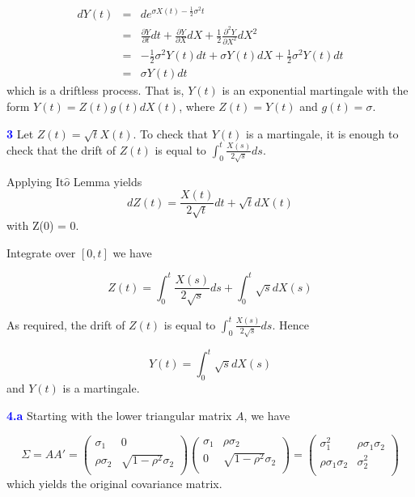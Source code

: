 \documentclass[a4paper,11pt] {article}
\begin{document}
\begin{eqnarray*}
dY(t) &=& de^{\sigma X(t) - \frac{1}{2}\sigma^2 t} \\
      &=& \frac{\partial Y}{\partial t} dt + \frac{\partial Y}{\partial X} dX + \frac{1}{2} \frac{\partial^2 Y}{\partial X^2} dX^2 \\
      &=& -\frac{1}{2}\sigma^2 Y(t)dt + \sigma Y(t)dX + \frac{1}{2} \sigma^2 Y(t) dt \\
      &=& \sigma Y(t) dt
\end{eqnarray*}
which is a driftless process. That is, $Y(t)$ is an exponential martingale with the form $Y(t)=Z(t)g(t)dX(t)$, where $Z(t) = Y(t)$ and $g(t) = \sigma$.

\textcolor{blue}{\bf 3 } Let $Z(t)=\sqrt{t}X(t)$. To check that $Y(t)$ is a martingale, it is enough to check that the drift of $Z(t)$ is equal to $\int_0^t \frac{X(s)}{2\sqrt{s}}ds$.

Applying It$\hat{o}$ Lemma yields
$$
dZ(t) = \frac{X(t)}{2\sqrt{t}}dt + \sqrt{t}dX(t)
$$
with Z(0) = 0.

Integrate over $[0,t]$ we have

$$
Z(t) = \int_0^t \frac{X(s)}{2\sqrt{s}}ds + \int_0^t \sqrt{s}dX(s)
$$

As required, the drift of $Z(t)$ is equal to $\int_0^t \frac{X(s)}{2\sqrt{s}}ds$. Hence

$$
Y(t) = \int_0^t \sqrt{s}dX(s)
$$
and $Y(t)$ is a martingale.

\textcolor{blue}{\bf 4.a } Starting with the lower triangular matrix $A$, we have

$$
\Sigma = AA' =
\left(
  \begin{array}{cc}
    \sigma_1 & 0 \\
    \rho \sigma_2 & \sqrt{1-\rho^2}\sigma_2 \\
  \end{array}
\right)
\left(
  \begin{array}{cc}
    \sigma_1 & \rho \sigma_2 \\
    0 & \sqrt{1-\rho^2}\sigma_2 \\
  \end{array}
\right)
=
\left(
  \begin{array}{cc}
    \sigma_1^2 & \rho \sigma_1 \sigma_2 \\
    \rho \sigma_1 \sigma_2 & \sigma_2^2 \\
  \end{array}
\right)
$$
which yields the original covariance matrix.
\end{document}
